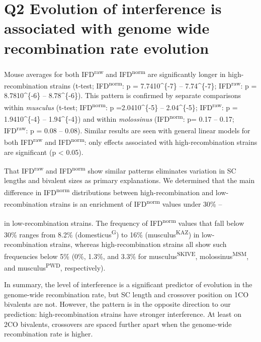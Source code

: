 \documentclass[]{article}
\begin{document}
\section{Q2 Evolution of interference is associated with genome wide
recombination rate
evolution}\label{q2-evolution-of-interference-is-associated-with-genome-wide-recombination-rate-evolution}

Mouse averages for both IFD\textsuperscript{raw} and
IFD\textsuperscript{norm} are significantly longer in high-recombination
strains (t-test; IFD\textsuperscript{norm}: p = 7.7410\^{}\{-7\} --
7.74\^{}\{-7\}; IFD\textsuperscript{raw}: p = 8.7810\^{}\{-6\}
-- 8.78\^{}\{-6\}). This pattern is confirmed by separate
comparisons within \emph{musculus} (t-test; IFD\textsuperscript{norm}: p
=2.0410\^{}\{-5\} -- 2.04\^{}\{-5\}; IFD\textsuperscript{raw}:
p = 1.9410\^{}\{-4\} -- 1.94\^{}\{-4\}) and within
\emph{molossinus} (IFD\textsuperscript{norm}: p= 0.17 -- 0.17;
IFD\textsuperscript{raw}: p = 0.08 -- 0.08). Similar results are seen
with general linear models for both IFD\textsuperscript{raw} and
IFD\textsuperscript{norm}: only effects associated with
high-recombination strains are significant (p \textless{} 0.05).

That IFD\textsuperscript{raw} and IFD\textsuperscript{norm} show similar
patterns eliminates variation in SC lengths and bivalent sizes as
primary explanations. We determined that the main difference in
IFD\textsuperscript{norm} distributions between high-recombination and
low-recombination strains is an enrichment of IFD\textsuperscript{norm}
values under 30\% --

in low-recombination strains. The frequency of IFD\textsuperscript{norm}
values that fall below 30\% ranges from 8.2\%
(domesticus\textsuperscript{G}) to 16\% (musculus\textsuperscript{KAZ})
in low-recombination strains, whereas high-recombination strains all
show such frequencies below 5\% (0\%, 1.3\%, and 3.3\% for
musculus\textsuperscript{SKIVE}, molossinus\textsuperscript{MSM}, and
musculus\textsuperscript{PWD}, respectively).

In summary, the level of interference is a significant predictor of
evolution in the genome-wide recombination rate, but SC length and
crossover position on 1CO bivalents are not. However, the pattern is in
the opposite direction to our prediction: high-recombination strains
have stronger interference. At least on 2CO bivalents, crossovers are
spaced further apart when the genome-wide recombination rate is higher.
\end{document}
